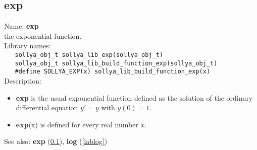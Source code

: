 \subsection{exp}
\label{labexp}
\noindent Name: \textbf{exp}\\
\phantom{aaa}the exponential function.\\[0.2cm]
\noindent Library names:\\
\verb|   sollya_obj_t sollya_lib_exp(sollya_obj_t)|\\
\verb|   sollya_obj_t sollya_lib_build_function_exp(sollya_obj_t)|\\
\verb|   #define SOLLYA_EXP(x) sollya_lib_build_function_exp(x)|\\[0.2cm]
\noindent Description: \begin{itemize}

\item \textbf{exp} is the usual exponential function defined as the solution of the
   ordinary differential equation $y'=y$ with $y(0)=1$.

\item \textbf{exp}(x) is defined for every real number $x$.
\end{itemize}
See also: \textbf{exp} (\ref{labexp}), \textbf{log} (\ref{lablog})
